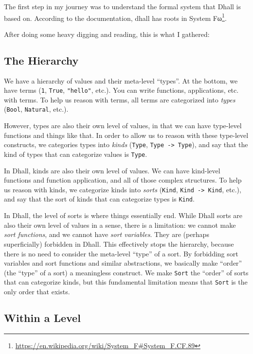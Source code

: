 \documentclass[]{article}
\renewcommand{\href}[2]{#2\footnote{\url{#1}}}
\begin{document}
The first step in my journey was to understand the formal system that Dhall is
based on. According to the documentation, dhall has roots in
\href{https://en.wikipedia.org/wiki/System_F\#System_F.CF.89}{System Fω}.

After doing some heavy digging and reading, this is what I gathered:

\subsection{The Hierarchy}\label{the-hierarchy}

We have a hierarchy of values and their meta-level ``types''. At the bottom, we
have terms (\texttt{1}, \texttt{True}, \texttt{"hello"}, etc.). You can write
functions, applications, etc. with terms. To help us reason with terms, all
terms are categorized into \emph{types} (\texttt{Bool}, \texttt{Natural}, etc.).

However, types are also their own level of values, in that we can have
type-level functions and things like that. In order to allow us to reason with
these type-level constructs, we categories types into \emph{kinds}
(\texttt{Type}, \texttt{Type\ -\textgreater{}\ Type}), and say that the kind of
types that can categorize values is \texttt{Type}.

In Dhall, kinds are also their own level of values. We can have kind-level
functions and function application, and all of those complex structures. To help
us reason with kinds, we categorize kinds into \emph{sorts} (\texttt{Kind},
\texttt{Kind\ -\textgreater{}\ Kind}, etc.), and say that the sort of kinds that
can categorize types is \texttt{Kind}.

In Dhall, the level of sorts is where things essentially end. While Dhall sorts
are also their own level of values in a sense, there is a limitation: we cannot
make \emph{sort functions}, and we cannot have \emph{sort variables}. They are
(perhaps superficially) forbidden in Dhall. This effectively stops the
hierarchy, because there is no need to consider the meta-level ``type'' of a
sort. By forbidding sort variables and sort functions and similar abstractions,
we basically make ``order'' (the ``type'' of a sort) a meaningless construct. We
make \texttt{Sort} the ``order'' of sorts that can categorize kinds, but this
fundamental limitation means that \texttt{Sort} is the only order that exists.

\subsection{Within a Level}\label{within-a-level}
\end{document}
